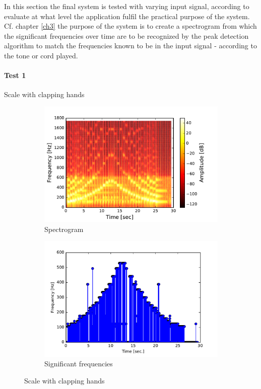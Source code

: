 In this section the final system is tested with varying input signal, according to evaluate at what level the application fulfil the practical purpose of the system. Cf. chapter \ref{ch3} the purpose of the system is to create a spectrogram from which the significant frequencies over time are to be recognized by the peak detection algorithm to match the frequencies known to be in the input signal - according to the tone or cord played.
\paragraph{Test 1} Scale with clapping hands
\begin{figure}[H]
\centering
\begin{subfigure}{0.49\textwidth}
\centering
\includegraphics[width=\textwidth]{figures/validation/systemtest/final_spec.pdf}
\caption{Spectrogram}
\label{fig:final_spec1}
\end{subfigure}
\begin{subfigure}{0.49\textwidth}
\centering
\includegraphics[width=\textwidth]{figures/validation/systemtest/final_peak.pdf}
\caption{Significant frequencies}
\label{fig:final_peak1}
\end{subfigure}
\label{fig:final_1}
\caption{Scale with clapping hands}
\end{figure} 
